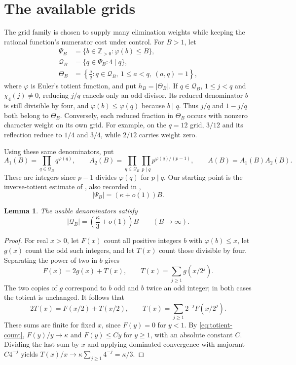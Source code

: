 \documentclass[11pt]{article}
\newtheorem{lemma}[theorem]{Lemma}
\theoremstyle{remark}
\newcommand{\Z}{\mathbb Z}
\numberwithin{equation}{section}
\begin{document}
\section{The available grids}\label{sec:grids}
The grid family is chosen to supply many elimination weights while
keeping the rational function's numerator cost under control. For $B>1$,
let
\begin{align*}
 \Psi_B&=\{b\in\Z_{>0}:\varphi(b)\leq B\},\\
 \mathcal Q_B&=\{q\in\Psi_B:4\mid q\},\\
 \Theta_B&=\left\{\frac aq:q\in\mathcal Q_B,\ 1\leq a<q,\ (a,q)=1\right\},
\end{align*}
where $\varphi$ is Euler's totient function, and put $h_B=|\Theta_B|$.
If $q\in\mathcal Q_B$, $1\leq j<q$ and $\chi_4(j)\ne0$, reducing $j/q$ cancels
only an odd divisor. Its reduced denominator $b$ is still divisible
by four, and $\varphi(b)\leq\varphi(q)$ because $b\mid q$. Thus
$j/q$ and $1-j/q$ both belong to $\Theta_B$. Conversely, each reduced
fraction in $\Theta_B$ occurs with nonzero character weight on its
own grid. For example, on the $q=12$ grid, $3/12$ and its reflection
reduce to $1/4$ and $3/4$, while $2/12$ carries weight zero.

Using these same denominators, put
\[
 A_1(B)=\prod_{q\in\mathcal Q_B}q^{\varphi(q)},\qquad
 A_2(B)=\prod_{q\in\mathcal Q_B}\prod_{p\mid q}p^{\varphi(q)/(p-1)},\qquad
 A(B)=A_1(B)A_2(B).
\]
These are integers since $p-1$ divides $\varphi(q)$ for $p\mid q$.
Our starting point is the inverse-totient estimate of
\cite[Proposition~2.2]{LY}, also recorded in \cite[Lemma~2.1]{FLSZ},
\begin{equation}\label{eq:totient-count}
 |\Psi_B|=(\kappa+o(1))B .
\end{equation}

\begin{lemma}\label{lem:grid-count}
The usable denominators satisfy
\[
 |\mathcal Q_B|=\left(\frac\kappa3+o(1)\right)B
 \qquad(B\to\infty).
\]
\end{lemma}
\begin{proof}
For real $x>0$, let $F(x)$ count all positive integers $b$ with
$\varphi(b)\leq x$, let $g(x)$ count the odd such integers, and let $T(x)$
count those divisible by four. Separating the power of two in $b$ gives
\[
 F(x)=2g(x)+T(x),\qquad
 T(x)=\sum_{j\geq1}g(x/2^j).
\]
The two copies of $g$ correspond to $b$ odd and $b$ twice an odd integer;
in both cases the totient is unchanged. It follows that
\[
 2T(x)=F(x/2)+T(x/2),\qquad
 T(x)=\sum_{j\geq1}2^{-j}F(x/2^j).
\]
These sums are finite for fixed $x$, since $F(y)=0$ for $y<1$.
By \eqref{eq:totient-count}, $F(y)/y\to\kappa$ and $F(y)\leq Cy$ for
$y\geq1$, with an absolute constant $C$. Dividing the last sum by $x$
and applying dominated convergence with majorant $C4^{-j}$ yields
$T(x)/x\to\kappa\sum_{j\geq1}4^{-j}=\kappa/3$.
\end{proof}
\end{document}
